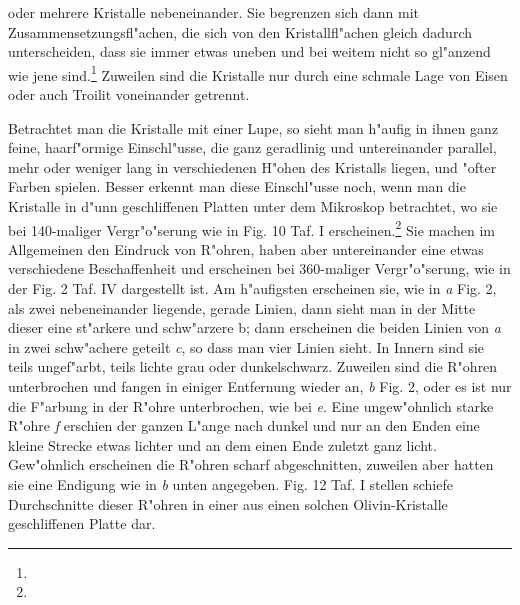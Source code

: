 \documentclass[a4paper, 11pt, oneside]{article}
\begin{document}
oder mehrere Kristalle nebeneinander. Sie begrenzen sich dann mit Zusammensetzungsfl"achen, die sich von den Kristallfl"achen gleich dadurch unterscheiden, dass sie immer etwas uneben und bei weitem nicht so gl"anzend wie jene sind.\footnote{} Zuweilen sind die Kristalle nur durch eine schmale Lage von Eisen oder auch Troilit voneinander getrennt.

Betrachtet man die Kristalle mit einer Lupe, so sieht man h"aufig in ihnen ganz feine, haarf"ormige Einschl"usse, die ganz geradlinig und untereinander parallel, mehr oder weniger lang in verschiedenen H"ohen des Kristalls liegen, und "ofter Farben spielen. Besser erkennt man diese Einschl"usse noch, wenn man die Kristalle in d"unn geschliffenen Platten unter dem Mikroskop betrachtet, wo sie bei 140-maliger Vergr"o"serung wie in Fig. 10 Taf. I erscheinen.\footnote{} Sie machen im Allgemeinen den Eindruck von R"ohren, haben aber untereinander eine etwas verschiedene Beschaffenheit und erscheinen bei 360-maliger Vergr"o"serung, wie in der Fig. 2 Taf. IV dargestellt ist. Am h"aufigsten erscheinen sie, wie in \emph{a} Fig. 2, als zwei nebeneinander liegende, gerade Linien, dann sieht man in der Mitte dieser eine st"arkere und schw"arzere b; dann erscheinen die beiden Linien von \emph{a} in zwei schw"achere geteilt \emph{c}, so dass man vier Linien sieht. In Innern sind sie teils ungef"arbt, teils lichte grau oder dunkelschwarz. Zuweilen sind die R"ohren unterbrochen und fangen in einiger Entfernung wieder an, \emph{b} Fig. 2, oder es ist nur die F"arbung in der R"ohre unterbrochen, wie bei \emph{e}. Eine ungew"ohnlich starke R"ohre \emph{f} erschien der ganzen L"ange nach dunkel und nur an den Enden eine kleine Strecke etwas lichter und an dem einen Ende zuletzt ganz licht. Gew"ohnlich erscheinen die R"ohren scharf abgeschnitten, zuweilen aber hatten sie eine Endigung wie in \emph{b} unten angegeben. Fig. 12 Taf. I stellen schiefe Durchschnitte dieser R"ohren in einer aus einen solchen Olivin-Kristalle geschliffenen Platte dar.
\end{document}
